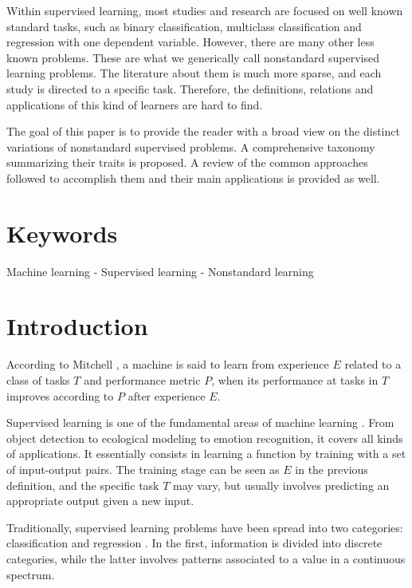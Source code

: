 Within supervised learning, most studies and research are focused on well known standard tasks, such as binary classification, multiclass classification and regression with one dependent variable. However, there are many other less known problems. These are what we generically call nonstandard supervised learning problems. The literature about them is much more sparse, and each study is directed to a specific task. Therefore, the definitions, relations and applications of this kind of learners are hard to find.

The goal of this paper is to provide the reader with a broad view on the distinct variations of nonstandard supervised problems. A comprehensive taxonomy summarizing their traits is proposed. A review of the common approaches followed to accomplish them and their main applications is provided as well.

\section*{Keywords}
Machine learning - Supervised learning - Nonstandard learning

\section{Introduction}
\label{p3intro}

According to Mitchell , a machine is said to learn from experience $E$ related to a class of tasks $T$ and performance metric $P$, when its performance at tasks in $T$  improves according to $P$ after experience $E$.

Supervised learning is one of the fundamental areas of machine learning . From object detection to ecological modeling to emotion recognition, it covers all kinds of applications. It essentially consists in learning a function by training with a set of input-output pairs. The training stage can be seen as $E$ in the previous definition, and the specific task $T$ may vary, but usually involves predicting an appropriate output given a new input.

Traditionally, supervised learning problems have been spread into two categories: classification and regression . In the first, information is divided into discrete categories, while the latter involves patterns associated to a value in a continuous spectrum.

